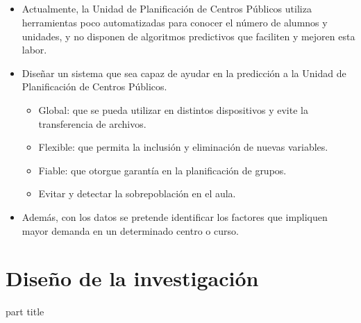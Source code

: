 \documentclass{beamer}
\begin{document}
\subsection{}
\begin{frame}
\frametitle{\secname}
\begin{itemize}
	\item Actualmente, la Unidad de Planificación de Centros Públicos utiliza herramientas poco automatizadas para conocer el número de alumnos y unidades, y no disponen de algoritmos predictivos que faciliten y mejoren esta labor.
	\item  Diseñar un sistema que sea capaz de ayudar en la predicción a la Unidad de Planificación de Centros Públicos.
	\begin{itemize}
		\item Global: que se pueda utilizar en distintos dispositivos y evite la transferencia de archivos.
		\item Flexible: que permita la inclusión y eliminación de nuevas variables.
		\item Fiable: que otorgue garantía en la planificación de grupos.
		\item Evitar y detectar la sobrepoblación en el aula.
	\end{itemize}
	\item Además, con los datos se pretende identificar los factores que impliquen mayor demanda en un determinado centro o curso.
\end{itemize}

\end{frame}

\section{Diseño de la investigación}
\begin{frame}
\begin{center}
	\begin{beamercolorbox}[
		sep=8pt,center,rounded=true,shadow=true]{part title}
		\secname
	\end{beamercolorbox}
\end{center}
\end{frame}
\end{document}
